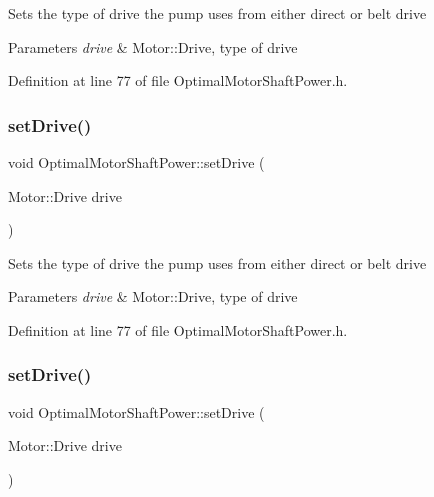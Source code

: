 Sets the type of drive the pump uses from either direct or belt drive 
\begin{DoxyParams}{Parameters}
{\em drive} & Motor\+::\+Drive, type of drive \\
\hline
\end{DoxyParams}


Definition at line 77 of file Optimal\+Motor\+Shaft\+Power.\+h.

\mbox{\label{class_optimal_motor_shaft_power_a8f3288a69848c61f4e8e2b14da549d16}} 
\subsubsection{\texorpdfstring{set\+Drive()}{setDrive()}\hspace{0.1cm}{\footnotesize\ttfamily [2/3]}}
{\footnotesize\ttfamily void Optimal\+Motor\+Shaft\+Power\+::set\+Drive (\begin{DoxyParamCaption}\item[{Motor\+::\+Drive}]{drive }\end{DoxyParamCaption})\hspace{0.3cm}{\ttfamily [inline]}}

Sets the type of drive the pump uses from either direct or belt drive 
\begin{DoxyParams}{Parameters}
{\em drive} & Motor\+::\+Drive, type of drive \\
\hline
\end{DoxyParams}


Definition at line 77 of file Optimal\+Motor\+Shaft\+Power.\+h.

\mbox{\label{class_optimal_motor_shaft_power_a8f3288a69848c61f4e8e2b14da549d16}} 
\subsubsection{\texorpdfstring{set\+Drive()}{setDrive()}\hspace{0.1cm}{\footnotesize\ttfamily [3/3]}}
{\footnotesize\ttfamily void Optimal\+Motor\+Shaft\+Power\+::set\+Drive (\begin{DoxyParamCaption}\item[{Motor\+::\+Drive}]{drive }\end{DoxyParamCaption})\hspace{0.3cm}{\ttfamily [inline]}}

